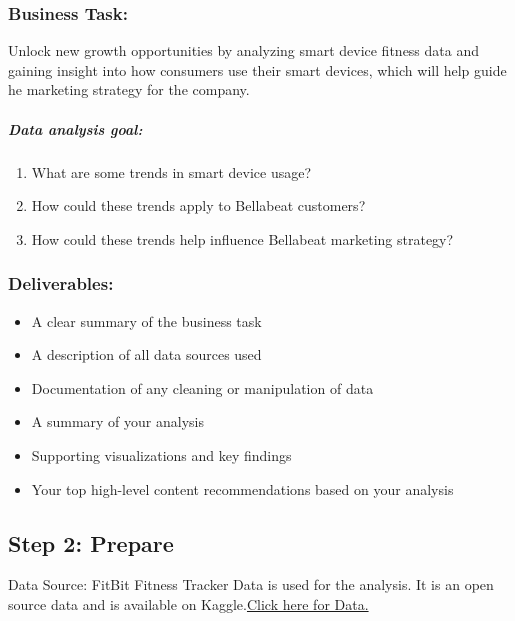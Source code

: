 \documentclass[
]{article}
\providecommand{\tightlist}{%
  \setlength{\itemsep}{0pt}\setlength{\parskip}{0pt}}
\begin{document}
\hypertarget{business-task}{%
\subsubsection{Business Task:}\label{business-task}}

Unlock new growth opportunities by analyzing smart device fitness data
and gaining insight into how consumers use their smart devices, which
will help guide he marketing strategy for the company.

\hypertarget{data-analysis-goal}{%
\subparagraph{Data analysis goal:}\label{data-analysis-goal}}

\begin{enumerate}
\def\labelenumi{\arabic{enumi}.}
\tightlist
\item
  What are some trends in smart device usage?
\item
  How could these trends apply to Bellabeat customers?
\item
  How could these trends help influence Bellabeat marketing strategy?
\end{enumerate}

\hypertarget{deliverables}{%
\subsubsection{Deliverables:}\label{deliverables}}

\begin{itemize}
\tightlist
\item
  A clear summary of the business task
\item
  A description of all data sources used
\item
  Documentation of any cleaning or manipulation of data
\item
  A summary of your analysis
\item
  Supporting visualizations and key findings
\item
  Your top high-level content recommendations based on your analysis
\end{itemize}

\hypertarget{step-2-prepare}{%
\subsection{Step 2: Prepare}\label{step-2-prepare}}

Data Source: FitBit Fitness Tracker Data is used for the analysis. It is
an open source data and is available on
Kaggle.\href{https://www.kaggle.com/datasets/arashnic/fitbit}{Click here
for Data.}
\end{document}
